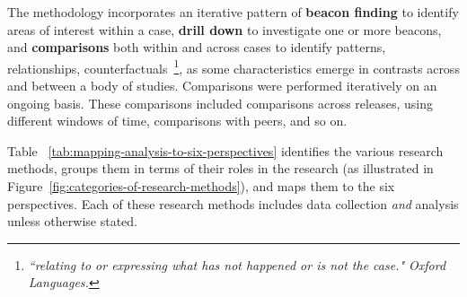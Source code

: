 The methodology incorporates an iterative pattern of \textbf{beacon finding} to identify areas of interest within a case, \textbf{drill down} to investigate one or more beacons, and \textbf{comparisons} both within and across cases to identify patterns, relationships, counterfactuals~\footnote{\emph{``relating to or expressing what has not happened or is not the case." Oxford Languages.}}, as some characteristics emerge in contrasts across and between a body of studies. 
%
Comparisons were performed iteratively on an ongoing basis. These comparisons included comparisons across releases, using different windows of time, comparisons with peers, and so on. %

\medskip


Table ~\ref{tab:mapping-analysis-to-six-perspectives} identifies the various research methods, groups them in terms of their roles in the research (as illustrated in Figure~\ref{fig:categories-of-research-methods}), and maps them to the six perspectives.  Each of these research methods includes data collection \textit{and} analysis unless otherwise stated.


